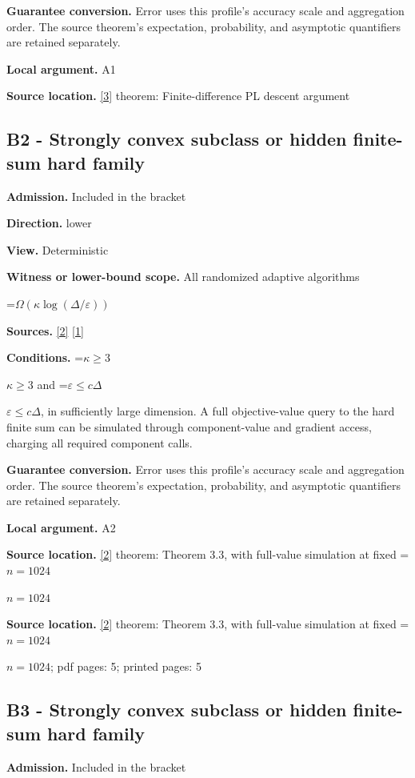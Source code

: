 \documentclass[10pt,a4paper]{article}
\newcommand{\AtlasMath}[1]{\par\begingroup\centering\setbox0=\hbox{$\displaystyle #1$}\ifdim\wd0>1.4\linewidth\typeout{ATLAS WIDE FORMULA: \the\wd0}\fi\ifdim\wd0>\linewidth\resizebox{\linewidth}{!}{\box0}\else\box0\fi\par\endgroup}
\newcommand{\AtlasInlineMath}[1]{\begingroup\setbox0=\hbox{$#1$}\ifdim\wd0>.4\linewidth\endgroup\AtlasMath{#1}\else\endgroup$#1$\fi}
\begin{document}
\textbf{Guarantee conversion.} Error uses this profile's accuracy scale and aggregation order. The source theorem's expectation, probability, and asymptotic quantifiers are retained separately.

\textbf{Local argument.} A1

\textbf{Source location.} \href{https://proceedings.mlr.press/v195/yue23a/yue23a.pdf}{[3]} theorem: Finite-difference PL descent argument

\subsection{B2 - Strongly convex subclass or hidden finite-sum hard family}
\textbf{Admission.} Included in the bracket

\textbf{Direction.} lower

\textbf{View.} Deterministic

\textbf{Witness or lower-bound scope.} All randomized adaptive algorithms

\AtlasMath{\Omega(\kappa\log(\Delta/\varepsilon))}
\textbf{Sources.} \href{https://arxiv.org/html/2609.00045v3}{[2]} \href{https://arxiv.org/html/2610.00345v1}{[1]}

\textbf{Conditions.} \AtlasInlineMath{\kappa\ge3} and \AtlasInlineMath{\varepsilon\le c\Delta}, in sufficiently large dimension. A full objective-value query to the hard finite sum can be simulated through component-value and gradient access, charging all required component calls.

\textbf{Guarantee conversion.} Error uses this profile's accuracy scale and aggregation order. The source theorem's expectation, probability, and asymptotic quantifiers are retained separately.

\textbf{Local argument.} A2

\textbf{Source location.} \href{https://arxiv.org/html/2609.00045v3}{[2]} theorem: Theorem 3.3, with full-value simulation at fixed \AtlasInlineMath{n=1024}

\textbf{Source location.} \href{https://arxiv.org/html/2609.00045v3}{[2]} theorem: Theorem 3.3, with full-value simulation at fixed \AtlasInlineMath{n=1024}; pdf pages: 5; printed pages: 5

\subsection{B3 - Strongly convex subclass or hidden finite-sum hard family}
\textbf{Admission.} Included in the bracket
\end{document}
